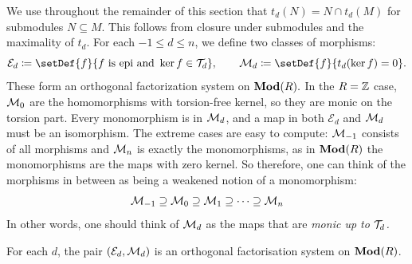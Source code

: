 \documentclass[runningheads]{llncs}
\begin{document}
We use throughout the remainder of this section that $t_d(N) = N \cap t_d(M)$ for submodules $N \subseteq M$. This follows from  closure under submodules and the maximality of $t_d$.
For each $-1 \leq d \leq n$, we define two classes of morphisms:
\begin{equation*}
  \mathcal E_d \coloneqq \setDef{f}{f \text{ is epi and } \ker f  \in \T_d},
  \qquad
  \M_d  \coloneqq \setDef{f}{t_d(\ker f) = 0}.
\end{equation*}
These form an orthogonal factorization system on $\operatorname{\mathbf{Mod}}(R).$
In the $R = \mathbb{Z}$ case, $\mathcal{M}_0$ are the homomorphisms with torsion-free kernel, so they are monic on the torsion part.  Every monomorphism is in $\mathcal{M}_d$, and a map in both $\mathcal E_d$ and $\mathcal{M}_d$ must be an isomorphism. The extreme cases are easy to compute: $\mathcal{M}_{-1}$ consists of all morphisms and $\mathcal{M}_n$ is exactly the monomorphisms, as in $\operatorname{\mathbf{Mod}}(R)$ the monomorphisms are the maps with zero kernel. So therefore, one can think of the morphisms in between as being a weakened notion of a monomorphism:
\begin{equation*}
\mathcal{M}_{-1} \supseteq \mathcal{M}_0 \supseteq \mathcal{M}_1 \supseteq \cdots \supseteq \mathcal{M}_n
\end{equation*}
In other words, one should think of $\mathcal{M}_d$ as the maps that are \emph{monic up to $\mathcal T_d$.}
\begin{propositionE}
\label{prop:ofs}
For each $d$, the pair $(\mathcal E_d, \mathcal{M}_d)$ is an orthogonal factorisation system on $\operatorname{\mathbf{Mod}}(R)$.
\end{propositionE}
\end{document}
